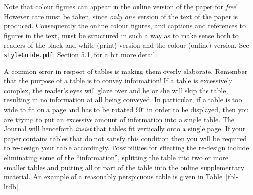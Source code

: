 \documentclass[
  times,
  doublespace]{anzsauth}
\begin{document}
Note that colour figures can appear in the online version of the paper
for \emph{free}! However care must be taken, since \emph{only one}
version of the text of the paper is produced. Consequently the online
colour figures, and captions and references to figures in the text, must
be structured in such a way as to make sense both to readers of the
black-and-white (print) version and the colour (online) version. See
\texttt{styleGuide.pdf}, Section 5.1, for a bit more detail.

A common error in respect of tables is making them overly elaborate.
Remember that the purpose of a table is to convey information! If a
table is excessively complex, the reader's eyes will glaze over and he
or she will skip the table, resulting in no information at all being
conveyed. In particular, if a table is too wide to fit on a page and has
to be rotated 90\(^\circ\) in order to be displayed, then you are trying
to put an excessive amount of information into a single table. The
Journal will henceforth \emph{insist} that tables fit vertically onto a
single page. If your paper contains tables that do not satisfy this
condition then you will be required to re-design your table accordingly.
Possibilities for effecting the re-design include eliminating some of
the ``information'', splitting the table into two or more smaller tables
and putting all or part of the table into the online supplementary
material. An example of a reasonably perspicuous table is given in
Table~\ref{tbl-ltdb}.
\end{document}
